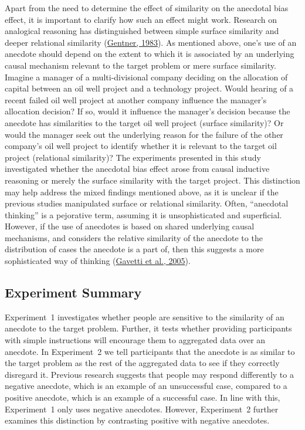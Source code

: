 \documentclass[
  man, donotrepeattitle,floatsintext]{apa7}
\theoremstyle{definition}
\theoremstyle{definition}
\theoremstyle{definition}
\theoremstyle{definition}
\theoremstyle{remark}
\begin{document}
Apart from the need to determine the effect of similarity on the anecdotal bias
effect, it is important to clarify how such an effect might work. Research on
analogical reasoning has distinguished between simple surface similarity and
deeper relational similarity (\protect\hyperlink{ref-gentner1983}{Gentner, 1983}). As mentioned above, one's use of
an anecdote should depend on the extent to which it is associated by an
underlying causal mechanism relevant to the target problem or mere surface
similarity. Imagine a manager of a multi-divisional company deciding on the
allocation of capital between an oil well project and a technology project.
Would hearing of a recent failed oil well project at another company influence
the manager's allocation decision? If so, would it influence the manager's
decision because the anecdote has similarities to the target oil well project
(surface similarity)? Or would the manager seek out the underlying reason for
the failure of the other company's oil well project to identify whether it is
relevant to the target oil project (relational similarity)? The experiments
presented in this study investigated whether the anecdotal bias effect arose
from causal inductive reasoning or merely the surface similarity with the target
project. This distinction may help address the mixed findings mentioned above,
as it is unclear if the previous studies manipulated surface or relational
similarity. Often, ``anecdotal thinking'' is a pejorative term, assuming it is
unsophisticated and superficial. However, if the use of anecdotes is based on
shared underlying causal mechanisms, and considers the relative similarity of
the anecdote to the distribution of cases the anecdote is a part of, then this
suggests a more sophisticated way of thinking (\protect\hyperlink{ref-gavetti2005}{Gavetti et al., 2005}).

\hypertarget{experiment-summary}{%
\subsection{Experiment Summary}\label{experiment-summary}}

Experiment~1 investigates whether people are sensitive to the similarity of an
anecdote to the target problem. Further, it tests whether providing participants
with simple instructions will encourage them to aggregated data over an
anecdote. In Experiment~2 we tell participants that the anecdote is as similar
to the target problem as the rest of the aggregated data to see if they
correctly disregard it. Previous research suggests that people may respond
differently to a negative anecdote, which is an example of an unsuccessful case,
compared to a positive anecdote, which is an example of a successful case. In
line with this, Experiment~1 only uses negative anecdotes. However, Experiment~2
further examines this distinction by contrasting positive with negative
anecdotes.
\end{document}
